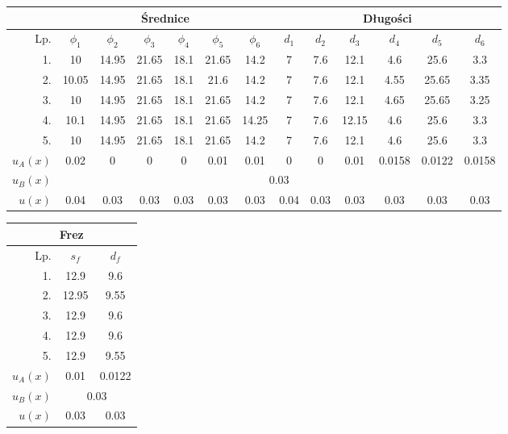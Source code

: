\begin{center}
    \begin{tabular}{|r|c|c|c|c|c|c| |c|c|c|c|c|c|}
        \hline
        & \multicolumn{6}{|c||}{Średnice} & \multicolumn{6}{|c|}{Długości}\\
        \hline
        Lp.  & $\phi_1$ & $\phi_2$ & $\phi_3$ & $\phi_4$ & $\phi_5$ & $\phi_6$   & $d_1$ & $d_2$ & $d_3$ & $d_4$ & $d_5$ & $d_6$ \\
        \hline
        1.   & 10    & 14.95 & 21.65 & 18.1 & 21.65 & 14.2                       & 7  & 7.6 & 12.1  & 4.6  & 25.6  & 3.3  \\
        \hline
        2.   & 10.05 & 14.95 & 21.65 & 18.1 & 21.6  & 14.2                       & 7  & 7.6 & 12.1  & 4.55 & 25.65 & 3.35 \\
        \hline
        3.   & 10    & 14.95 & 21.65 & 18.1 & 21.65 & 14.2                       & 7  & 7.6 & 12.1  & 4.65 & 25.65 & 3.25 \\
        \hline
        4.   & 10.1  & 14.95 & 21.65 & 18.1 & 21.65 & 14.25                      & 7  & 7.6 & 12.15 & 4.6  & 25.6  & 3.3  \\
        \hline
        5.   & 10    & 14.95 & 21.65 & 18.1 & 21.65 & 14.2                       & 7  & 7.6 & 12.1  & 4.6  & 25.6  & 3.3  \\
        \hline
        $u_A(x)$ & 0.02 & 0 & 0 & 0 & 0.01 & 0.01                                & 0 & 0 & 0.01 & 0.0158 & 0.0122 & 0.0158\\
        \hline
        $u_B(x)$ & \multicolumn{12}{|c|}{0.03} \\
        \hline
        $u(x)$ & 0.04 & 0.03 & 0.03 & 0.03 & 0.03 & 0.03                         & 0.04 & 0.03 & 0.03 & 0.03 & 0.03 & 0.03\\
        \hline
    \end{tabular}

    \vspace{5mm}

    \begin{tabular}{|r|c|c|}
        \hline
        \multicolumn{3}{|c|}{Frez} \\
        \hline
        Lp.  & $s_f$ & $d_f$ \\
        \hline
        1.   & 12.9  & 9.6  \\
        \hline
        2.   & 12.95 & 9.55 \\
        \hline
        3.   & 12.9  & 9.6  \\
        \hline
        4.   & 12.9  & 9.6  \\
        \hline
        5.   & 12.9  & 9.55 \\
        \hline
        $u_A(x)$ & 0.01 & 0.0122 \\
        \hline
        $u_B(x)$ & \multicolumn{2}{|c|}{0.03} \\
        \hline
        $u(x)$ & 0.03 & 0.03 \\
        \hline
    \end{tabular}
\end{center}


